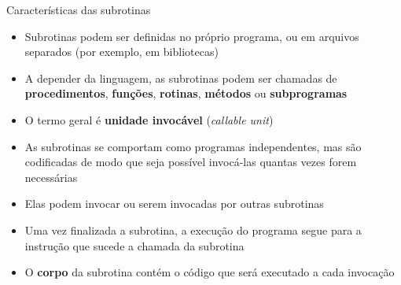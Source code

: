 \begin{frame}[fragile]{Características das subrotinas}

    \begin{itemize}
        \item Subrotinas podem ser definidas no próprio programa, ou em arquivos separados (por 
            exemplo, em bibliotecas)

        \item A depender da linguagem, as subrotinas podem ser chamadas de \textbf{procedimentos},
            \textbf{funções}, \textbf{rotinas}, \textbf{métodos} ou \textbf{subprogramas}

        \item O termo geral é \textbf{unidade invocável} (\textit{callable unit})

        \item As subrotinas se comportam como programas independentes, mas são codificadas de modo
            que seja possível invocá-las quantas vezes forem necessárias

        \item Elas podem invocar ou serem invocadas por outras subrotinas

        \item Uma vez finalizada a subrotina, a execução do programa segue para a instrução que
            sucede a chamada da subrotina

        \item O \textbf{corpo} da subrotina contém o código que será executado a cada invocação
    \end{itemize}

\end{frame}

